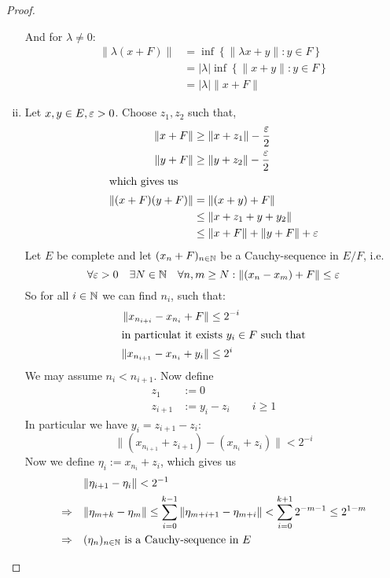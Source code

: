 \begin{proof}
\begin{enumerate}[(i)]
			And for $\lambda \neq 0$:
			\begin{align*}
				\|\lambda (x+F)\|
				&= \inf\left\{ \|\lambda x + y\| : y \in F \right\}\\
				&= |\lambda| \inf\left\{ \| x + y\| : y \in F \right\}\\
				&= |\lambda| \|x + F\|
			\end{align*}
		\item Let $x,y \in E, \varepsilon > 0$. Choose $z_1, z_2$ such that,
			\begin{align*}
				\| x + F \| &\ge \|x + z_1\| - \frac{\varepsilon}{2} \\
				\| y + F \| &\ge \|y + z_2\| - \frac{\varepsilon}{2} \\
				\intertext{which gives us}
				\|(x+F) (y+F)\|	&= \|(x+y) + F\| \\
								&\le \|x+z_1 + y + y_2\| \\
								&\le \|x + F\| + \| y + F\| + \varepsilon
			\end{align*}
			Let $E$ be complete and let $(x_n + F)_{n\in \mathbb{N}}$ be a Cauchy-sequence in $E/F$, i.e.
			\begin{equation*}
				\forall {\varepsilon > 0} \quad \exists {N \in \mathbb{N}} \quad \forall {n,m \ge N} : \|(x_n - x_m) + F\| \le \varepsilon
			\end{equation*}
			So for all $i \in \mathbb{N}$ we can find $n_i$, such that:
			\begin{align*}
				\|x_{n_{i+i}} - x_{n_i} + F\| 		&\le 2^{-i} \\
				\intertext{in particulat it exists $y_i \in F$ such that}
				\|x_{n_{i+1}} - x_{n_{i}} + y_i\|	&\le 2^{i}
			\end{align*}
			We may assume $n_i < n_{i+1}$. Now define
			\begin{align*}
				z_1 	&:= 0 \\
				z_{i+1}	&:= y_i - z_i \qquad i \ge 1
			\end{align*}
			In particular we have $y_i = z_{i+1} - z_i$:
			\begin{equation*}
				\|(x_{n_{i+1}} + z_{i+1}) - (x_{n_i} + z_i)\| < 2^{-i}
			\end{equation*}
			Now we define $\eta_i := x_{n_i} + z_i$, which gives us
			\begin{align*}
							& \| \eta_{i+1} - \eta_i\| < 2^{-1}\\
				\Ra \quad	& \|\eta_{m+k} - \eta_m\| \le \sum_{i=0}^{k-1} \|\eta_{m+i+1} - \eta_{m+i}\| < \sum_{i=0}^{k+1} 2^{-m-1} \le 2^{1-m}\\ 
				\Ra \quad	& \sequ{\eta} \text{ is a Cauchy-sequence in } E\\

\end{align*}
\end{enumerate}
\end{proof}
